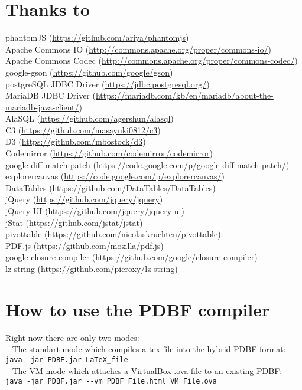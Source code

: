 \documentclass[11pt]{article}
\begin{document}
\section{Thanks to}
phantomJS (\url{https://github.com/ariya/phantomjs})\\
Apache Commons IO (\url{http://commons.apache.org/proper/commons-io/})\\
Apache Commons Codec (\url{http://commons.apache.org/proper/commons-codec/})\\
google-gson (\url{https://github.com/google/gson})\\
postgreSQL JDBC Driver (\url{https://jdbc.postgresql.org/})\\
MariaDB JDBC Driver (\url{https://mariadb.com/kb/en/mariadb/about-the-mariadb-java-client/})\\
AlaSQL (\url{https://github.com/agershun/alasql})\\
C3 (\url{https://github.com/masayuki0812/c3})\\
D3 (\url{https://github.com/mbostock/d3})\\
Codemirror (\url{https://github.com/codemirror/codemirror})\\
google-diff-match-patch (\url{https://code.google.com/p/google-diff-match-patch/})\\
explorercanvas (\url{https://code.google.com/p/explorercanvas/})\\
DataTables (\url{https://github.com/DataTables/DataTables})\\
jQuery (\url{https://github.com/jquery/jquery})\\
jQuery-UI (\url{https://github.com/jquery/jquery-ui})\\
jStat (\url{https://github.com/jstat/jstat})\\
pivottable (\url{https://github.com/nicolaskruchten/pivottable})\\
PDF.js (\url{https://github.com/mozilla/pdf.js})\\
google-closure-compiler (\url{https://github.com/google/closure-compiler})\\
lz-string (\url{https://github.com/pieroxy/lz-string})\\

\section{How to use the PDBF compiler}
Right now there are only two modes: \\[4pt]
-- The standart mode which compiles a tex file into the hybrid PDBF format:\\
\verb|java -jar PDBF.jar LaTeX_file| \\[2pt]
-- The VM mode which attaches a VirtualBox .ova file to an existing PDBF:\\
\verb|java -jar PDBF.jar --vm PDBF_File.html VM_File.ova|
\end{document}
